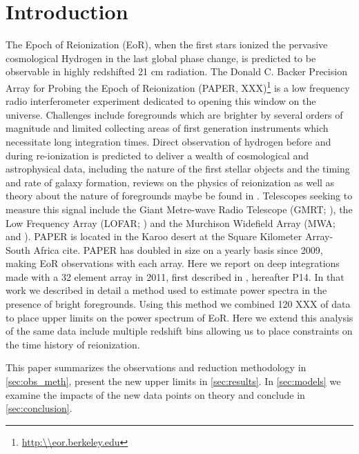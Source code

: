 \documentclass[preprint]{aastex}
\begin{document}
\section{Introduction}
The Epoch of Reionization (EoR), when the first stars ionized the pervasive cosmological Hydrogen in the last global phase change, is predicted to be observable in highly redshifted 21 cm radiation.  The Donald C. Backer Precision Array for Probing the Epoch of Reionization (PAPER, XXX)\footnote{\url{http:\\eor.berkeley.edu}} is a low frequency radio interferometer experiment dedicated to opening this window on the universe.  Challenges include foregrounds which are brighter by several orders of magnitude and limited collecting areas of first generation instruments which necessitate long integration times. Direct observation of hydrogen before and during re-ionization is predicted to deliver a wealth of cosmological and astrophysical data, including the nature of the first stellar objects and the timing and rate of galaxy formation, reviews on the physics of reionization as well as theory about the nature of foregrounds maybe be found in \citet{Furlanetto:2006p2267,Morales:2010p8093,Pritchard:2012p9555}.
Telescopes seeking to measure this signal include the Giant Metre-wave Radio Telescope (GMRT; \cite{Paciga:2013p9943}), the Low Frequency Array (LOFAR; \cite{Yatawatta:2013p9699}) and the Murchison Widefield Array (MWA; \cite{Bowman:2013p9950} and \cite{Tingay:2013p9022}). PAPER is located in the Karoo desert at the Square Kilometer Array-South Africa cite. PAPER has doubled in size on a yearly basis since 2009, making  EoR observations with each array.  Here we report on deep integrations made with a 32 element array in 2011, first described in \cite{Parsons:2013p9876}, hereafter P14.  In that work we described in detail a method used to estimate power spectra in the presence of bright foregrounds. Using this method we combined 120 XXX of data to place upper limits on the power spectrum of EoR. Here we extend this analysis of the same data include multiple redshift bins allowing us to place constraints on the time history of reionization.

This paper summarizes the observations and reduction methodology in \ref{sec:obs_meth}, present the new upper limits in \ref{sec:results}. In \ref{sec:models} we examine the impacts of the new data points on theory and conclude in \ref{sec:conclusion}.



%
\end{document}
